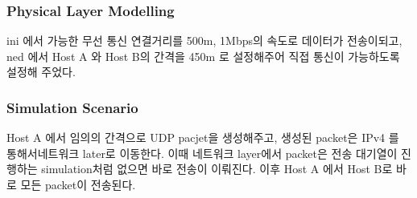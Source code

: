     \subsubsection*{Physical Layer Modelling }
    \vspace{-2mm}
    ini 에서 가능한 무선 통신 연결거리를 500m, 1Mbps의 속도로 데이터가 전송이되고, ned 에서 Host A 와 Host B의 간격을 450m 로 설정해주어 직접 통신이 가능하도록 설정해 주었다. 
    \subsubsection*{Simulation Scenario}
    Host A 에서 임의의 간격으로 UDP pacjet을 생성해주고, 생성된 packet은 IPv4 를 통해서네트워크 later로 이동한다. 이때 네트워크 layer에서 packet은 전송 대기열이 진행하는 simulation처럼 없으면 바로 전송이 이뤄진다. 이후 Host A 에서 Host B로 바로 모든 packet이 전송된다.
    
\clearpage